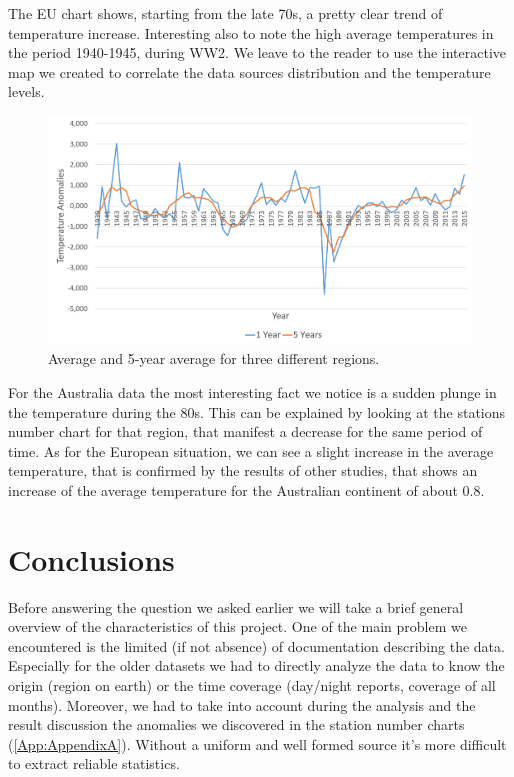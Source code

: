 \documentclass{vldb}
\begin{document}
The EU chart shows, starting from the late 70s, a pretty clear trend of temperature increase. Interesting also to note the high average temperatures in the period 1940-1945, during WW2. We leave to the reader to use the interactive map we created to correlate the data sources distribution and the temperature levels.

\begin{figure}[tbh]
\includegraphics[width=1\linewidth]{AuAnomalies}
\caption{Average and 5-year average for three different regions.}
\label{fig:AuAnomalies}
\end{figure}

For the Australia data the most interesting fact we notice is a sudden plunge in the temperature during the 80s. This can be explained by looking at the stations number chart for that region, that manifest a decrease for the same period of time. As for the European situation, we can see a slight increase in the average temperature, that is confirmed by the results of other studies, that shows an increase of the average temperature for the Australian continent of about 0.8\degree. 

\section{Conclusions}
\label{sec:con}
Before answering the question we asked earlier we will take a brief general overview of the characteristics of this project. One of the main problem we encountered is the limited (if not absence) of documentation describing the data. Especially for the older datasets we had to directly analyze the data to know the origin (region on earth) or the time coverage (day/night reports, coverage of all months). Moreover, we had to take into account during the analysis and the result discussion the anomalies we discovered in the station number charts (\ref{App:AppendixA}). Without a uniform and well formed source it's more difficult to extract reliable statistics.\\
\end{document}
